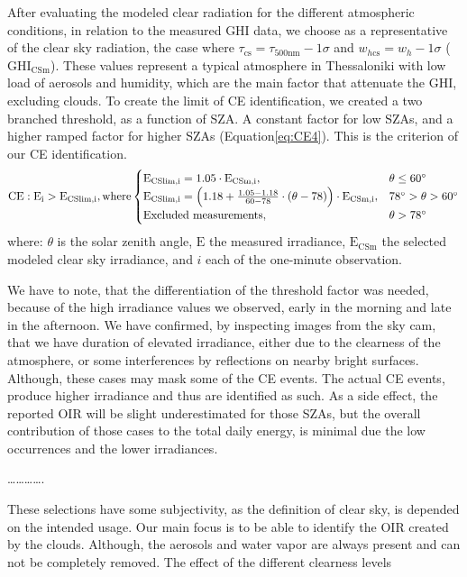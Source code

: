 \documentclass[
  preprint, 3p, authoryear]{article}
\begin{document}
After evaluating the modeled clear radiation for the different atmospheric
conditions, in relation to the measured GHI data, we choose as a representative of
the clear sky radiation, the case where
\(\tau_{\text{cs}} = \tau_{500\text{nm}} - 1\sigma\) and \(w_{h\text{cs}} = w_h - 1\sigma\)
(\(\text{GHI}_\text{CSm}\)).
These values represent a typical atmosphere in Thessaloniki with low load of aerosols
and humidity, which are the main factor that attenuate the GHI, excluding clouds. To
create the limit of CE identification, we created a two branched threshold, as a
function of SZA. A constant factor for low SZAs, and a higher ramped factor for
higher SZAs (Equation\nobreakspace\ref{eq:CE4}).
This is the criterion of our CE identification.
\begin{equation}
\text{CE} : \text{E}_\text{i} > \text{E}_\text{CSlim,i}, \text{where} \begin{cases}
 \text{E}_\text{CSlim,i} = 1.05 \cdot \text{E}_\text{CSm,i}, & \text{$\theta \leq 60^\circ$}\\
\text{E}_\text{CSlim,i} = \left ({ 1.18 + \frac{1.05 - 1.18}{60 - 78} \cdot (\theta- 78) } \right ) \cdot \text{E}_\text{CSm,i}, & \text{$ 78^\circ > \theta > 60^\circ$}\\
\text{Excluded measurements}, & \theta > 78^\circ
\end{cases}\label{eq:CE4}
\end{equation}
where: \(\theta\) is the solar zenith angle, \(\text{E}\) the measured
irradiance, \(\text{E}_\text{CSm}\) the selected modeled clear sky irradiance, and \(i\) each of the one-minute observation.

We have to note, that the differentiation of the threshold factor was needed, because
of the high irradiance values we observed, early in the morning and late in the
afternoon. We have confirmed, by inspecting images from the sky cam, that we have
duration of elevated irradiance, either due to the clearness of the atmosphere, or some
interferences by reflections on nearby bright surfaces. Although, these cases may
mask some of the CE events. The actual CE events, produce higher irradiance and thus
are identified as such. As a side effect, the reported OIR will be slight
underestimated for those SZAs, but the overall contribution of those cases to the
total daily energy, is minimal due the low occurrences and the lower irradiances.

\ldots\ldots\ldots\ldots.

These selections have some subjectivity, as the definition of clear sky, is depended
on the intended usage. Our main focus is to be able to identify the OIR created by the
clouds. Although, the aerosols and water vapor are always present and can not be
completely removed.
The effect of the different clearness levels
\end{document}
